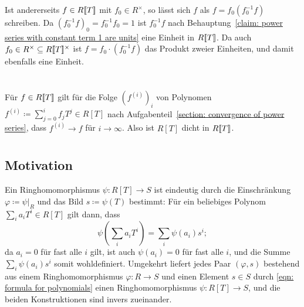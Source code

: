 \documentclass[a4paper, 10pt, numbers=noenddot]{scrartcl}
\begin{document}
Ist andererseits $f \in R[\![T]\!]$ mit $f_0 \in R^\times$, so lässt sich $f$ als $f = f_0 (f_0^{-1} f)$ schreiben.
Da $(f_0^{-1} f)_0 = f_0^{-1} f_0 = 1$ ist $f_0^{-1} f$ nach Behauptung~\ref{claim: power series with constant term 1 are units} eine Einheit in $R[\![T]\!]$.
Da auch $f_0 \in R^\times \subseteq R[\![T]\!]^\times$ ist $f = f_0 \cdot (f_0^{-1} f)$ das Produkt zweier Einheiten, und damit ebenfalls eine Einheit.





\section{}


Für $f \in R[\![T]\!]$ gilt für die Folge $(f^{(i)})_i$ von Polynomen $f^{(i)} \coloneqq \sum_{j=0}^i f_j T^j \in R[T]$ nach Aufgabenteil~\ref{section: convergence of power series}, dass $f^{(i)} \to f$ für $i \to \infty$.
Also ist $R[T]$ dicht in $R[\![T]\!]$.





\section{}



\subsection*{Motivation}

Ein Ringhomomorphismus $\psi \colon R[T] \to S$ ist eindeutig durch die Einschränkung $\varphi \coloneqq \psi|_R$ und das Bild $s \coloneqq \psi(T)$ bestimmt:
Für ein beliebiges Polynom $\sum_i a_i T^i \in R[T]$ gilt dann, dass
\begin{equation}
  \label{eqn: formula for polynomials}
    \psi\left( \sum_i a_i T^i \right)
  = \sum_i \psi(a_i) s^i;
\end{equation}
da $a_i = 0$ für fast alle $i$ gilt, ist auch $\psi(a_i) = 0$ für fast alle $i$, und die Summe $\sum_i \psi(a_i) s^i$ somit wohldefiniert.
Umgekehrt liefert jedes Paar $(\varphi, s)$ bestehend aus einem Ringhomomorphismus $\varphi \colon R \to S$ und einen Element $s \in S$ durch \eqref{eqn: formula for polynomials} einen Ringhomomorphismus $\psi \colon R[T] \to S$, und die beiden Konstruktionen sind invers zueinander.
\end{document}

